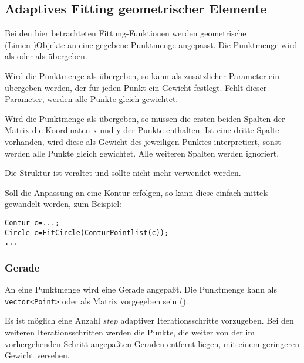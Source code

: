 

\subsection{Adaptives Fitting geometrischer Elemente}
\label{Adaptives Fitting}

Bei den hier betrachteten Fittung-Funktionen werden geometrische
(Linien-)Objekte an eine gegebene Punktmenge angepasst. Die Punktmenge wird
als  oder als  übergeben.

Wird die Punktmenge als  übergeben, so kann als zusätzlicher 
Parameter ein  übergeben werden, der für jeden Punkt 
ein Gewicht festlegt. Fehlt dieser Parameter, werden alle Punkte gleich gewichtet.

Wird die Punktmenge als  übergeben, so müssen die ersten 
beiden Spalten der Matrix die Koordinaten x und y der Punkte enthalten. 
Ist eine dritte Spalte vorhanden, wird diese als Gewicht des jeweiligen 
Punktes interpretiert, sonst werden 
alle Punkte gleich gewichtet. Alle weiteren Spalten werden ignoriert.

Die Struktur  ist veraltet und sollte nicht mehr 
verwendet werden. 

Soll die Anpassung an eine Kontur erfolgen, so kann diese einfach mittels 
 gewandelt werden, zum Beispiel:
\begin{verbatim}
Contur c=...;
Circle c=FitCircle(ConturPointlist(c));
...
\end{verbatim}

\subsubsection{Gerade}
An eine Punktmenge wird eine Gerade angepaßt. Die Punktmenge kann als
\verb+vector<Point>+ oder als Matrix vorgegeben sein ().

Es ist möglich eine Anzahl $step$ adaptiver Iterationsschritte vorzugeben.
Bei den weiteren Iterationsschritten werden die Punkte, die weiter von der im 
vorhergehenden Schritt angepaßten Geraden entfernt liegen, mit einem 
geringeren Gewicht versehen.

